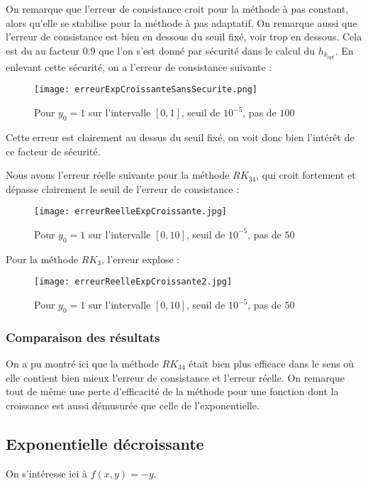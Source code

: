 \documentclass[a4paper, titlepage]{livret} %
\begin{document}
					On remarque que l'erreur de consistance croit pour la méthode à pas constant, alors qu'elle se stabilise pour la méthode à pas adaptatif.
					On remarque aussi que l'erreur de consistance est bien en dessous du seuil fixé, voir trop en dessous.
					Cela est du au facteur $0.9$ que l'on s'est donné par sécurité dans le calcul du $h_{{k}_{opt}}$.
					En enlevant cette sécurité, on a l'erreur de consistance suivante :
					\begin{figure}[!h]
						\centering
  							\texttt{[image: erreurExpCroissanteSansSecurite.png]}
  							\caption{Pour $y_0=1$ sur l'intervalle $[0,1]$, seuil de $10^{-5}$, pas de $100$}
					\end{figure}

					Cette erreur est clairement au dessus du seuil fixé, on voit donc bien l'intérêt de ce facteur de sécurité.
					\newpage

					Nous avons l'erreur réelle suivante pour la méthode $RK_{34}$, qui croit fortement et dépasse clairement le seuil de l'erreur de consistance :
					\begin{figure}[!h]
						\centering
  							\texttt{[image: erreurReelleExpCroissante.jpg]}
  							\caption{Pour $y_0=1$ sur l'intervalle $[0,10]$, seuil de $10^{-5}$, pas de $50$}
					\end{figure}

					Pour la méthode $RK_{3}$, l'erreur explose :
					\begin{figure}[!h]
						\centering
  							\texttt{[image: erreurReelleExpCroissante2.jpg]}
  							\caption{Pour $y_0=1$ sur l'intervalle $[0,10]$, seuil de $10^{-5}$, pas de $50$}
					\end{figure}


				\subsubsection{Comparaison des résultats}
					On a pu montré ici que la méthode $RK_{34}$ était bien plus efficace dans le sens où elle contient bien mieux l'erreur de consistance et l'erreur réelle.
					On remarque tout de même une perte d'efficacité de la méthode pour une fonction dont la croissance est aussi démusurée que celle de l'exponentielle.

			\subsection{Exponentielle décroissante}
				On s'intéresse ici à $f(x,y) = -y$.
\end{document}
